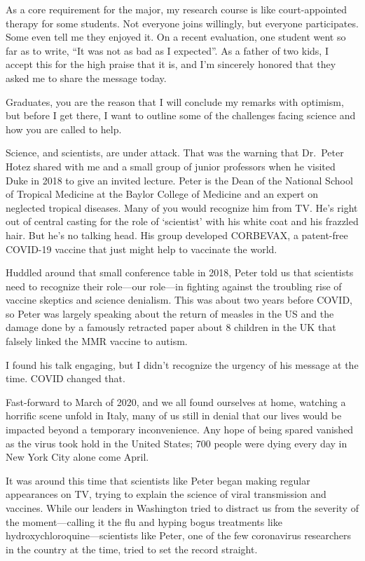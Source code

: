 \documentclass[
  letterpaper,
  DIV=11,
  numbers=noendperiod,
  oneside]{scrreprt}
\begin{document}
As a core requirement for the major, my research course is like
court-appointed therapy for some students. Not everyone joins willingly,
but everyone participates. Some even tell me they enjoyed it. On a
recent evaluation, one student went so far as to write, ``It was not as
bad as I expected''. As a father of two kids, I accept this for the high
praise that it is, and I'm sincerely honored that they asked me to share
the message today.

Graduates, you are the reason that I will conclude my remarks with
optimism, but before I get there, I want to outline some of the
challenges facing science and how you are called to help.

Science, and scientists, are under attack. That was the warning that
Dr.~Peter Hotez shared with me and a small group of junior professors
when he visited Duke in 2018 to give an invited lecture. Peter is the
Dean of the National School of Tropical Medicine at the Baylor College
of Medicine and an expert on neglected tropical diseases. Many of you
would recognize him from TV. He's right out of central casting for the
role of `scientist' with his white coat and his frazzled hair. But he's
no talking head. His group developed CORBEVAX, a patent-free COVID-19
vaccine that just might help to vaccinate the world.

Huddled around that small conference table in 2018, Peter told us that
scientists need to recognize their role---our role---in fighting against
the troubling rise of vaccine skeptics and science denialism. This was
about two years before COVID, so Peter was largely speaking about the
return of measles in the US and the damage done by a famously retracted
paper about 8 children in the UK that falsely linked the MMR vaccine to
autism.

I found his talk engaging, but I didn't recognize the urgency of his
message at the time. COVID changed that.

Fast-forward to March of 2020, and we all found ourselves at home,
watching a horrific scene unfold in Italy, many of us still in denial
that our lives would be impacted beyond a temporary inconvenience. Any
hope of being spared vanished as the virus took hold in the United
States; 700 people were dying every day in New York City alone come
April.

It was around this time that scientists like Peter began making regular
appearances on TV, trying to explain the science of viral transmission
and vaccines. While our leaders in Washington tried to distract us from
the severity of the moment---calling it the flu and hyping bogus
treatments like hydroxychloroquine---scientists like Peter, one of the
few coronavirus researchers in the country at the time, tried to set the
record straight.
\end{document}
